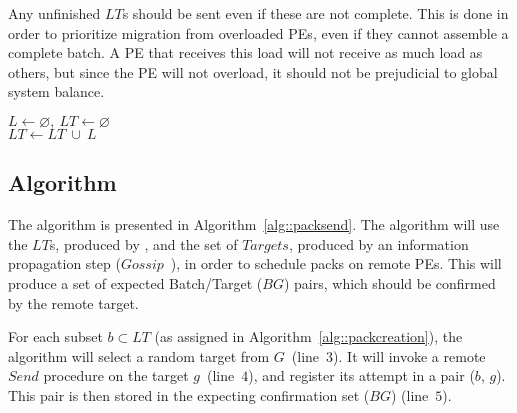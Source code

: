 Any unfinished $LT$s should be sent even if these are not complete.
This is done in order to prioritize migration from overloaded PEs, even if they cannot assemble a complete batch.
A PE that receives this load will not receive as much load as others, but since the PE will not overload, it should not be prejudicial to global system balance.

\begin{algorithm}[b]
    \DontPrintSemicolon
    $L \gets \varnothing,\ LT \gets \varnothing$ \\
    $LT \gets LT\ \cup\ L$   
    \caption{\batchassembly} 
    \label{alg::packcreation}
\end{algorithm}

\subsection{\batchsend Algorithm} \label{sec:algo:sending}

The \batchsend algorithm is presented in Algorithm~\ref{alg::packsend}.
The algorithm will use the $LT$s, produced by \batchassembly, and the set of $Targets$, produced by an information propagation step ($Gossip$~\cite{gossip}), in order to schedule packs on remote PEs.
This will produce a set of expected Batch/Target ($BG$) pairs, which should be confirmed by the remote target.

For each subset $b \subset LT$ (as assigned in Algorithm~\ref{alg::packcreation}), the algorithm will select a random target from $G$~(line~$3$).
It will invoke a remote $Send$ procedure on the target $g$~(line~$4$), and register its attempt in a pair ($b$, $g$).
This pair is then stored in the expecting confirmation set ($BG$) (line~$5$).

